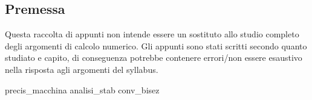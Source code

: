 \documentclass[12pt,a4paper,headings=optiontohead]{article}
\begin{document}
\begin{center}
\pagebreak

\section*{Premessa}
\begin{minipage}{0.9\textwidth} \large

Questa raccolta di appunti non intende essere un sostituto allo studio completo degli argomenti di calcolo numerico. Gli appunti sono stati scritti secondo quanto studiato e capito, di conseguenza potrebbe contenere errori/non essere esaustivo nella risposta agli argomenti del syllabus.

\end{minipage}

\end{center}
\pagebreak


\tableofcontents

\newpage
{precis_macchina}
\newpage
{analisi_stab}
\newpage
{conv_bisez}
\end{document}
